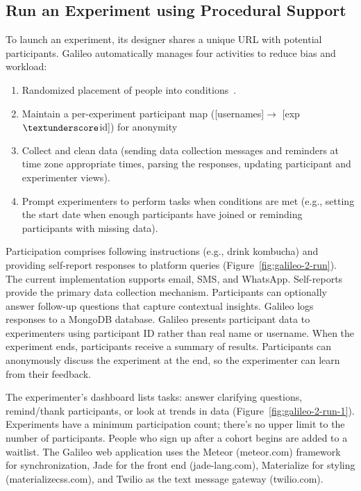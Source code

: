 \subsection{Run an Experiment using Procedural Support}
To launch an experiment, its designer shares a unique URL with potential participants. Galileo automatically manages four activities to reduce bias and workload:
\begin{enumerate}
\item Randomized placement of people into conditions~\cite{Martin2007}.
\item Maintain a per-experiment participant map ([usernames]$\rightarrow$ [exp$\textunderscore$id]) for anonymity
\item Collect and clean data (sending data collection messages and reminders at time zone appropriate times, parsing the responses, updating participant and experimenter views). 
\item Prompt experimenters to perform tasks when conditions are met (e.g., setting the start date when enough participants have joined or reminding participants with missing data). 
\end{enumerate}

Participation comprises following instructions (e.g., drink kombucha) and providing self-report responses to platform queries (Figure~\ref{fig:galileo-2-run}). The current implementation supports email, SMS, and WhatsApp. Self-reports provide the primary data collection mechanism. Participants can optionally answer follow-up questions that capture contextual insights. Galileo logs responses to a MongoDB database. Galileo presents participant data to experimenters using participant ID rather than real name or username. When the experiment ends, participants receive a summary of results. Participants can anonymously discuss the experiment at the end, so the experimenter can learn from their feedback. 

The experimenter's dashboard lists tasks: answer clarifying questions, remind/thank participants, or look at trends in data (Figure~\ref{fig:galileo-2-run-1}). Experiments have a minimum participation count; there's no upper limit to the number of participants. People who sign up after a cohort begins are added to a waitlist.
The Galileo web application uses the Meteor (meteor.com) framework for synchronization, Jade for the front end (jade-lang.com), Materialize for styling (materializecss.com), and Twilio as the text message gateway (twilio.com).

